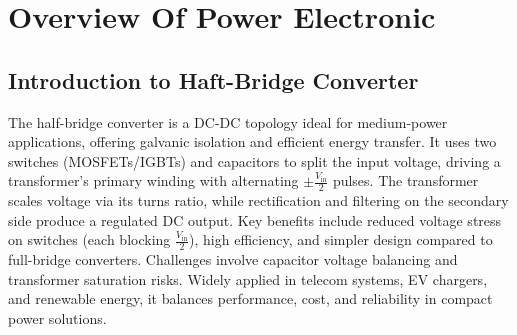 \section{Overview Of Power Electronic}
\subsection{Introduction to Haft-Bridge Converter} 
The half-bridge converter is a DC-DC topology ideal for medium-power applications, offering galvanic isolation and efficient energy transfer. It uses two switches (MOSFETs/IGBTs) and capacitors to split the input voltage, driving a transformer's primary winding with alternating $\pm \frac{V_\text{in}}{2}$ pulses. The transformer scales voltage via its turns ratio, while rectification and filtering on the secondary side produce a regulated DC output. Key benefits include reduced voltage stress on switches (each blocking $\frac{V_\text{in}}{2}$), high efficiency, and simpler design compared to full-bridge converters. Challenges involve capacitor voltage balancing and transformer saturation risks. Widely applied in telecom systems, EV chargers, and renewable energy, it balances performance, cost, and reliability in compact power solutions.
